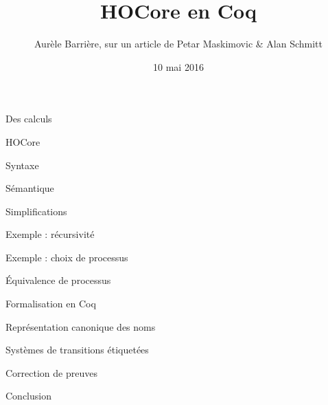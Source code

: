 \documentclass{beamer}
\title{HOCore en Coq}
\date{10 mai 2016}
\author{Aurèle Barrière, sur un article de Petar Maskimovic \& Alan Schmitt}
\begin{document}
\begin{frame}
\maketitle
\end{frame}

\begin{frame}{Des calculs}
\end{frame}


\begin{frame}{HOCore}
\end{frame}

\begin{frame}{Syntaxe}
\end{frame}

\begin{frame}{Sémantique}
\end{frame}

\begin{frame}{Simplifications}
\end{frame}

\begin{frame}{Exemple : récursivité}
\end{frame}

\begin{frame}{Exemple : choix de processus}
\end{frame}

\begin{frame}{Équivalence de processus}
\end{frame}

\begin{frame}{Formalisation en Coq}
\end{frame}

\begin{frame}{Représentation canonique des noms}
\end{frame}

\begin{frame}{Systèmes de transitions étiquetées}
\end{frame}

\begin{frame}{Correction de preuves}
\end{frame}

\begin{frame}{Conclusion}
\end{frame}
\end{document}
